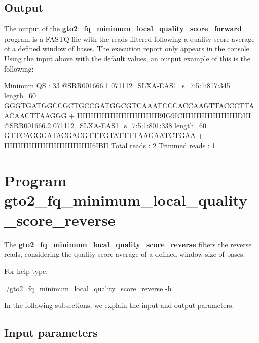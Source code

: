 \documentclass[11pt,]{krantz}
\newenvironment{Shaded}{\begin{snugshade}}{\end{snugshade}}
\newcommand{\ExtensionTok}[1]{#1}
\newcommand{\NormalTok}[1]{#1}
\begin{document}
\subsection*{Output}\label{output-18}


The output of the
\textbf{gto2\_fq\_minimum\_local\_quality\_score\_forward} program is a
FASTQ file with the reads filtered following a quality score average of
a defined window of bases. The execution report only appears in the
console. Using the input above with the default values, an output
example of this is the following:

\begin{Shaded}
\begin{Highlighting}[]
\ExtensionTok{Minimum}\NormalTok{ QS     : 33}
\ExtensionTok{@SRR001666.1}\NormalTok{ 071112_SLXA-EAS1_s_7:5:1:817:345 length=60}
\ExtensionTok{GGGTGATGGCCGCTGCCGATGGCGTCAAATCCCACCAAGTTACCCTTAACAACTTAAGGG}
\ExtensionTok{+}
\ExtensionTok{IIIIIIIIIIIIIIIIIIIIIIIIIIIIII9IG9ICIIIIIIIIIIIIIIIIIIIIDIII}
\ExtensionTok{@SRR001666.2}\NormalTok{ 071112_SLXA-EAS1_s_7:5:1:801:338 length=60}
\ExtensionTok{GTTCAGGGATACGACGTTTGTATTTTAAGAATCTGAA}
\ExtensionTok{+}
\ExtensionTok{IIIIIIIIIIIIIIIIIIIIIIIIIIIIIIII6IBII}
\ExtensionTok{Total}\NormalTok{ reads    : 2}
\ExtensionTok{Trimmed}\NormalTok{ reads  : 1}
\end{Highlighting}
\end{Shaded}

\section{Program
gto2\_fq\_minimum\_local\_quality\_score\_reverse}\label{program-gto2_fq_minimum_local_quality_score_reverse}

The \textbf{gto2\_fq\_minimum\_local\_quality\_score\_reverse} filters
the reverse reads, considering the quality score average of a defined
window size of bases.

For help type:

\begin{Shaded}
\begin{Highlighting}[]
\ExtensionTok{./gto2_fq_minimum_local_quality_score_reverse}\NormalTok{ -h}
\end{Highlighting}
\end{Shaded}

In the following subsections, we explain the input and output
parameters.

\subsection*{Input parameters}\label{input-parameters-19}
\end{document}
